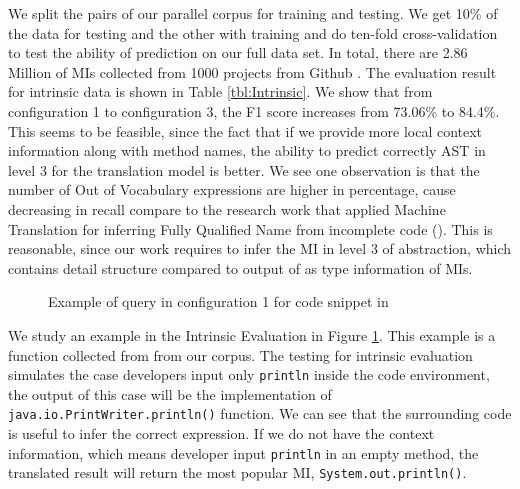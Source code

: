 We split the pairs of our parallel corpus for training and testing. We get 10\% of the data for testing and the other with training and do ten-fold cross-validation to test the ability of prediction on our full data set. In total, there are 2.86 Million of MIs collected from 1000 projects from Github \cite{id:Github}.
The evaluation result for intrinsic data is shown in Table \ref{tbl:Intrinsic}. We show that from configuration 1 to configuration 3, the F1 score increases from 73.06\% to 84.4\%. This seems to be feasible, since the fact that if we provide more local context information along with method names, the ability to predict correctly AST in level 3 for the translation model is better. We see one observation is that the number of Out of Vocabulary expressions are higher in percentage, cause decreasing in recall compare to the research work that applied Machine Translation for inferring Fully Qualified Name from incomplete code (\cite{8453132}). This is reasonable, since our work requires to infer the MI in level 3 of abstraction, which contains detail structure compared to output of \cite{8453132} as type information of MIs. 
\begin{figure}[]
        \caption{\label{fig:example_in} Example of query in configuration 1 for code snippet in \cite{id:IntrinsicAndroidExample}}
      \end{figure}
We study an example in the Intrinsic Evaluation in Figure \ref{fig:example_in}. This example is a function collected from \cite{id:IntrinsicAndroidExample} from our corpus. The testing for intrinsic evaluation simulates the case developers input only \texttt{println} inside the code environment, the output of this case will be the implementation of \texttt{java.io.PrintWriter.println()} function. We can see that the surrounding code is useful to infer the correct expression. If we do not have the context information, which means developer input \texttt{println} in an empty method, the translated result will return the most popular MI, \texttt{System.out.println()}.

